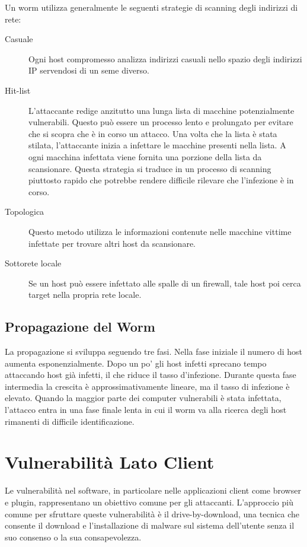 Un worm utilizza generalmente le seguenti strategie di scanning degli indirizzi di rete:

\begin{description}
    \item[Casuale] Ogni host compromesso analizza indirizzi casuali nello spazio degli indirizzi IP servendosi di un seme diverso.
    
    \item[Hit-list] L'attaccante redige anzitutto una lunga lista di macchine potenzialmente vulnerabili. Questo può essere un processo lento e prolungato per evitare che si scopra che è in corso un attacco. Una volta che la lista è stata stilata, l'attaccante inizia a infettare le macchine presenti nella lista. A ogni macchina infettata viene fornita una porzione della lista da scansionare. Questa strategia si traduce in un processo di scanning piuttosto rapido che potrebbe rendere difficile rilevare che l'infezione è in corso.
    
    \item[Topologica] Questo metodo utilizza le informazioni contenute nelle macchine vittime infettate per trovare altri host da scansionare.
    
    \item[Sottorete locale] Se un host può essere infettato alle spalle di un firewall, tale host poi cerca target nella propria rete locale.
\end{description}

\subsection{Propagazione del Worm}

La propagazione si sviluppa seguendo tre fasi. Nella fase iniziale il numero di host aumenta esponenzialmente. Dopo un po' gli host infetti sprecano tempo attaccando host già infetti, il che riduce il tasso d'infezione. Durante questa fase intermedia la crescita è approssimativamente lineare, ma il tasso di infezione è elevato. Quando la maggior parte dei computer vulnerabili è stata infettata, l'attacco entra in una fase finale lenta in cui il worm va alla ricerca degli host rimanenti di difficile identificazione.

\section{Vulnerabilità Lato Client}

Le vulnerabilità nel software, in particolare nelle applicazioni client come browser e plugin, rappresentano un obiettivo comune per gli attaccanti. L'approccio più comune per sfruttare queste vulnerabilità è il drive-by-download, una tecnica che consente il download e l'installazione di malware sul sistema dell'utente senza il suo consenso o la sua consapevolezza.

